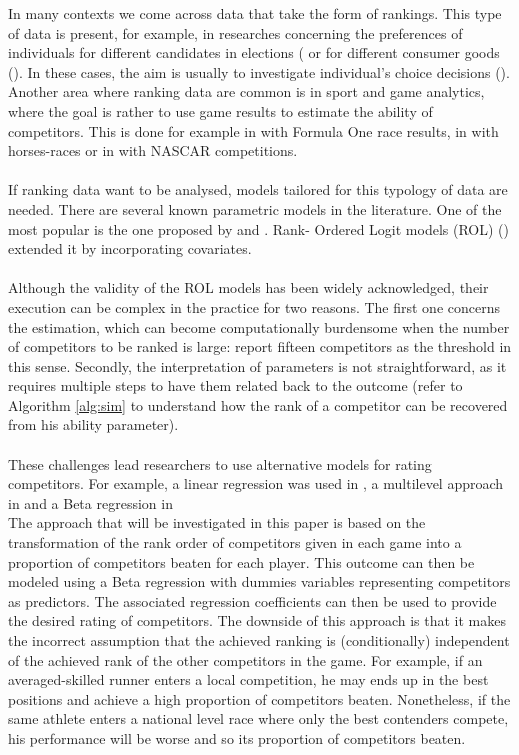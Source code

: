 In many contexts we come across data that take the form of rankings. This type of data is present, for example, in researches concerning the preferences of individuals for different candidates in elections ( \cite{stern1993probability} \cite{koop1994rank} or for different consumer goods (\cite{beggs1981assessing}). In these cases, the aim is usually to investigate individual's choice decisions  (\cite{yu2019analysis}).  Another area where ranking data are common is in sport  and game analytics, where the goal is rather to use game results to estimate the ability of competitors. This is done for example in \cite{van2023bayesian} with Formula One race results, in \cite{ali1998probability} with horses-races or in \cite{graves2003hierarchical} with NASCAR competitions. \\
\\
If ranking data want to be analysed, models tailored for this typology of data are needed. There are several known parametric models in the literature. One of the most popular is the one proposed by \cite{luce1959possible} and \cite{plackett1975analysis}. Rank- Ordered Logit models (ROL) (\cite{hausman1987specifying}) extended it by incorporating covariates. \\
\\
Although the validity of the ROL models has been widely acknowledged, their execution can be complex in the practice for two reasons. The first one concerns the estimation, which can become computationally burdensome when the number of competitors to be ranked is large: \cite{alvo2014statistical}  report fifteen competitors as the threshold in this sense. Secondly, the interpretation of parameters is not straightforward, as it requires multiple steps to have them related back to the outcome (refer to  Algorithm \ref{alg:sim} to understand how the rank of a competitor can be recovered from his ability parameter).\\
\\
These challenges lead researchers to use alternative models for rating competitors. For example, a linear regression was used in \cite{eichenberger2009best}, a multilevel approach in \cite{bell2016formula} and a Beta regression in \cite{stern2008ranking} \\
The approach that will be investigated in this paper is based on the transformation of the rank order of competitors given in each game into a proportion of competitors beaten for each player. This outcome can then be modeled using a Beta regression with dummies variables representing competitors as predictors. The associated regression coefficients can then be used to provide the desired rating of competitors. The downside of this approach is that it makes the incorrect assumption that the achieved ranking is (conditionally) independent of the achieved rank of the other competitors in the game. For example, if an averaged-skilled runner enters a local competition, he may ends up in the best positions and achieve a high proportion of competitors beaten. Nonetheless, if the same athlete enters a national level race where only the best contenders compete, his performance will be worse and so its proportion of competitors beaten.\\

